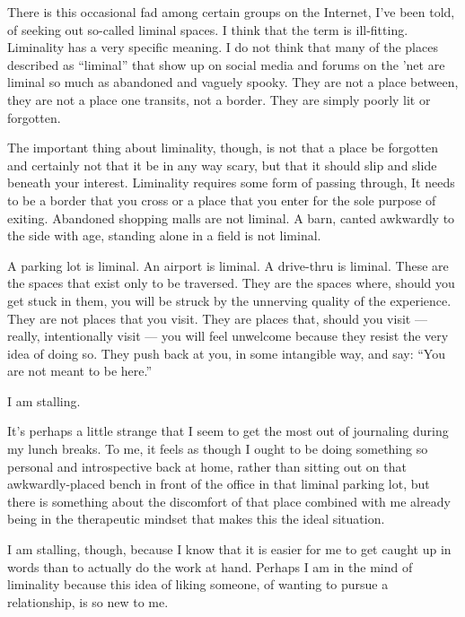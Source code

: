 There is this occasional fad among certain groups on the Internet, I've been told, of seeking out so-called liminal spaces. I think that the term is ill-fitting. Liminality has a very specific meaning. I do not think that many of the places described as ``liminal'' that show up on social media and forums on the 'net are liminal so much as abandoned and vaguely spooky. They are not a place between, they are not a place one transits, not a border. They are simply poorly lit or forgotten.

The important thing about liminality, though, is not that a place be forgotten and certainly not that it be in any way scary, but that it should slip and slide beneath your interest. Liminality requires some form of passing through, It needs to be a border that you cross or a place that you enter for the sole purpose of exiting. Abandoned shopping malls are not liminal. A barn, canted awkwardly to the side with age, standing alone in a field is not liminal.

A parking lot is liminal. An airport is liminal. A drive-thru is liminal. These are the spaces that exist only to be traversed. They are the spaces where, should you get stuck in them, you will be struck by the unnerving quality of the experience. They are not places that you visit. They are places that, should you visit --- really, intentionally visit --- you will feel unwelcome because they resist the very idea of doing so. They push back at you, in some intangible way, and say: ``You are not meant to be here.''

I am stalling.

It's perhaps a little strange that I seem to get the most out of journaling during my lunch breaks. To me, it feels as though I ought to be doing something so personal and introspective back at home, rather than sitting out on that awkwardly-placed bench in front of the office in that liminal parking lot, but there is something about the discomfort of that place combined with me already being in the therapeutic mindset that makes this the ideal situation.

I am stalling, though, because I know that it is easier for me to get caught up in words than to actually do the work at hand. Perhaps I am in the mind of liminality because this idea of liking someone, of wanting to pursue a relationship, is so new to me.

